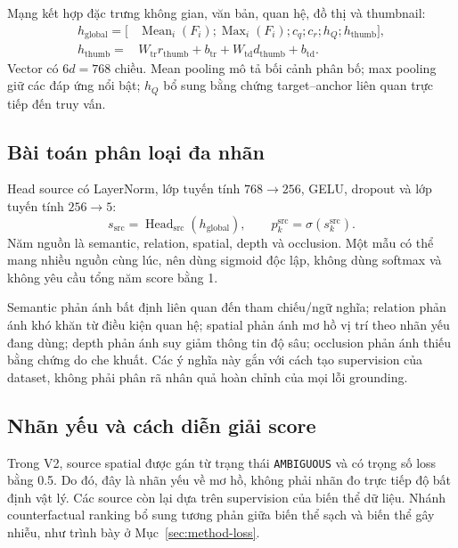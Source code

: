 Mạng kết hợp đặc trưng không gian, văn bản, quan hệ, đồ thị và
thumbnail:
\begin{equation}
\begin{split}
    h_{\mathrm{global}}=[&
    \operatorname{Mean}_{i}(F_i);
    \operatorname{Max}_{i}(F_i);
    c_q;c_r;h_Q;h_{\mathrm{thumb}}],\\
    h_{\mathrm{thumb}}={}&
    W_{\mathrm{tr}}r_{\mathrm{thumb}}+b_{\mathrm{tr}}
    +W_{\mathrm{td}}d_{\mathrm{thumb}}+b_{\mathrm{td}}.
\end{split}
\end{equation}
Vector có $6d=768$ chiều. Mean pooling mô tả bối cảnh phân bố;
max pooling giữ các đáp ứng nổi bật; $h_Q$ bổ sung bằng chứng
target--anchor liên quan trực tiếp đến truy vấn.

\subsection{Bài toán phân loại đa nhãn}

Head source có LayerNorm, lớp tuyến tính $768\rightarrow256$,
GELU, dropout và lớp tuyến tính $256\rightarrow5$:
\begin{equation}
    s_{\mathrm{src}}=
    \operatorname{Head}_{\mathrm{src}}(h_{\mathrm{global}}),
    \qquad p_k^{\mathrm{src}}=\sigma(s_k^{\mathrm{src}}).
\end{equation}
Năm nguồn là semantic, relation, spatial, depth và occlusion.
Một mẫu có thể mang nhiều nguồn cùng lúc, nên dùng sigmoid độc
lập, không dùng softmax và không yêu cầu tổng năm score bằng 1.

Semantic phản ánh bất định liên quan đến tham chiếu/ngữ nghĩa;
relation phản ánh khó khăn từ điều kiện quan hệ; spatial phản
ánh mơ hồ vị trí theo nhãn yếu đang dùng; depth phản ánh suy giảm
thông tin độ sâu; occlusion phản ánh thiếu bằng chứng do che khuất.
Các ý nghĩa này gắn với cách tạo supervision của dataset, không
phải phân rã nhân quả hoàn chỉnh của mọi lỗi grounding.

\subsection{Nhãn yếu và cách diễn giải score}

Trong V2, source spatial được gán từ trạng thái \texttt{AMBIGUOUS}
và có trọng số loss bằng 0.5. Do đó, đây là nhãn yếu về mơ hồ,
không phải nhãn đo trực tiếp độ bất định vật lý.
Các source còn lại dựa trên supervision của biến thể dữ liệu.
Nhánh counterfactual ranking bổ sung tương phản giữa biến thể
sạch và biến thể gây nhiễu, như trình bày ở
Mục~\ref{sec:method-loss}.

